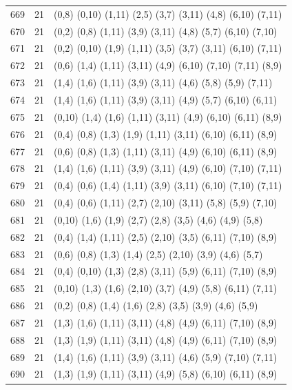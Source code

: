 \begin{appendix}
{\begin{longtable}{lll}
669& 21 & (0,8)   (0,10) (1,11) (2,5)   (3,7)   (3,11)  (4,8)   (6,10)  (7,11)\\
670& 21 & (0,2)   (0,8)  (1,11) (3,9)   (3,11)  (4,8)   (5,7)   (6,10)  (7,10)\\
671& 21 & (0,2)   (0,10) (1,9)  (1,11)  (3,5)   (3,7)   (3,11)  (6,10)  (7,11)\\
672& 21 & (0,6)   (1,4)  (1,11) (3,11)  (4,9)   (6,10)  (7,10)  (7,11)  (8,9)\\
673& 21 & (1,4)   (1,6)  (1,11) (3,9)   (3,11)  (4,6)   (5,8)   (5,9)   (7,11)\\
674& 21 & (1,4)   (1,6)  (1,11) (3,9)   (3,11)  (4,9)   (5,7)   (6,10)  (6,11)\\
675& 21 & (0,10)  (1,4)  (1,6)  (1,11)  (3,11)  (4,9)   (6,10)  (6,11)  (8,9)\\
676& 21 & (0,4)   (0,8)  (1,3)  (1,9)   (1,11)  (3,11)  (6,10)  (6,11)  (8,9)\\
677& 21 & (0,6)   (0,8)  (1,3)  (1,11)  (3,11)  (4,9)   (6,10)  (6,11)  (8,9)\\
678& 21 & (1,4)   (1,6)  (1,11) (3,9)   (3,11)  (4,9)   (6,10)  (7,10)  (7,11)\\
679& 21 & (0,4)   (0,6)  (1,4)  (1,11)  (3,9)   (3,11)  (6,10)  (7,10)  (7,11)\\
680& 21 & (0,4)   (0,6)  (1,11) (2,7)   (2,10)  (3,11)  (5,8)   (5,9)   (7,10)\\
681& 21 & (0,10)  (1,6)  (1,9)  (2,7)   (2,8)   (3,5)   (4,6)   (4,9)   (5,8)\\
682& 21 & (0,4)   (1,4)  (1,11) (2,5)   (2,10)  (3,5)   (6,11)  (7,10)  (8,9)\\
683& 21 & (0,6)   (0,8)  (1,3)  (1,4)   (2,5)   (2,10)  (3,9)   (4,6)   (5,7)\\
684& 21 & (0,4)   (0,10) (1,3)  (2,8)   (3,11)  (5,9)   (6,11)  (7,10)  (8,9)\\
685& 21 & (0,10)  (1,3)  (1,6)  (2,10)  (3,7)   (4,9)   (5,8)   (6,11)  (7,11)\\
686& 21 & (0,2)   (0,8)  (1,4)  (1,6)   (2,8)   (3,5)   (3,9)   (4,6)   (5,9)\\
687& 21 & (1,3)   (1,6)  (1,11) (3,11)  (4,8)   (4,9)   (6,11)  (7,10)  (8,9)\\
688& 21 & (1,3)   (1,9)  (1,11) (3,11)  (4,8)   (4,9)   (6,11)  (7,10)  (8,9)\\
689& 21 & (1,4)   (1,6)  (1,11) (3,9)   (3,11)  (4,6)   (5,9)   (7,10)  (7,11)\\
690& 21 & (1,3)   (1,9)  (1,11) (3,11)  (4,9)   (5,8)   (6,10)  (6,11)  (8,9)\\

\end{longtable}}
\end{appendix}
